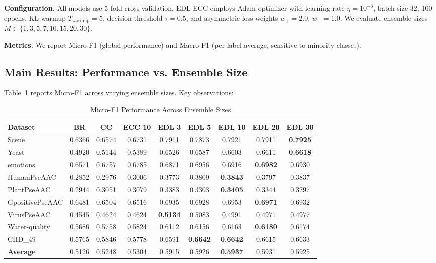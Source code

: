 \documentclass[conference]{IEEEtran}
\begin{document}
\textbf{Configuration.} All models use 5-fold cross-validation. EDL-ECC employs Adam optimizer with learning rate $\eta = 10^{-3}$, batch size 32, 100 epochs, KL warmup $T_{\text{warmup}} = 5$, decision threshold $\tau = 0.5$, and asymmetric loss weights $w_+ = 2.0$, $w_- = 1.0$. We evaluate ensemble sizes $M \in \{1, 3, 5, 7, 10, 15, 20, 30\}$.

\textbf{Metrics.} We report Micro-F1 (global performance) and Macro-F1 (per-label average, sensitive to minority classes).

\subsection{Main Results: Performance vs. Ensemble Size}

Table~\ref{tab:ensemble_size} reports Micro-F1 across varying ensemble sizes. Key observations:

\begin{table}[t]
\centering
\caption{Micro-F1 Performance Across Ensemble Sizes}
\label{tab:ensemble_size}
\small
\begin{tabular}{lcccccccc}
\toprule
\textbf{Dataset} & \textbf{BR} & \textbf{CC} & \textbf{ECC 10} & \textbf{EDL 3} & \textbf{EDL 5} & \textbf{EDL 10} & \textbf{EDL 20} & \textbf{EDL 30} \\
\midrule
Scene & 0.6366 & 0.6574 & 0.6731 & 0.7911 & 0.7873 & 0.7921 & 0.7911 & \textbf{0.7925} \\
Yeast & 0.4920 & 0.5144 & 0.5389 & 0.6526 & 0.6587 & 0.6603 & 0.6611 & \textbf{0.6618} \\
emotions & 0.6571 & 0.6757 & 0.6785 & 0.6871 & 0.6956 & 0.6916 & \textbf{0.6982} & 0.6930 \\
HumanPseAAC & 0.2852 & 0.2976 & 0.3006 & 0.3773 & 0.3809 & \textbf{0.3843} & 0.3797 & 0.3837 \\
PlantPseAAC & 0.2944 & 0.3051 & 0.3079 & 0.3383 & 0.3303 & \textbf{0.3405} & 0.3344 & 0.3297 \\
GpositivePseAAC & 0.6481 & 0.6504 & 0.6516 & 0.6935 & 0.6928 & 0.6953 & \textbf{0.6971} & 0.6932 \\
VirusPseAAC & 0.4545 & 0.4624 & 0.4624 & \textbf{0.5134} & 0.5083 & 0.4991 & 0.4971 & 0.4977 \\
Water-quality & 0.5686 & 0.5758 & 0.5824 & 0.6112 & 0.6156 & 0.6163 & \textbf{0.6180} & 0.6174 \\
CHD\_49 & 0.5765 & 0.5846 & 0.5778 & 0.6591 & \textbf{0.6642} & \textbf{0.6642} & 0.6615 & 0.6633 \\
\midrule
\textbf{Average} & 0.5126 & 0.5248 & 0.5304 & 0.5915 & 0.5926 & \textbf{0.5937} & 0.5931 & 0.5925 \\
\bottomrule
\end{tabular}
\end{table}
\end{document}
